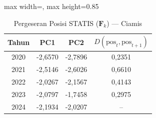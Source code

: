 \begin{table}[H]
\centering
\caption{Pergeseran Posisi STATIS ($\mathbf{F}_k$) --- Ciamis} \label{tab:app2jarak_statis_skor_ciamis}
\begin{adjustbox}{max width=\textwidth, max height=0.85\textheight}
\begin{tabular}{|c|c|c|c|}
\hline
\textbf{Tahun} & \textbf{PC1} & \textbf{PC2} & \textbf{$D(\text{pos}_t, \text{pos}_{t+1})$} \\
\hline
2020 & -2,6570 & -2,7896 & 0,2351 \\
2021 & -2,5146 & -2,6026 & 0,6610 \\
2022 & -2,0267 & -2,1567 & 0,4143 \\
2023 & -2,0797 & -1,7458 & 0,2975 \\
2024 & -2,1934 & -2,0207 & -- \\
\hline
\end{tabular}
\end{adjustbox}
\end{table}